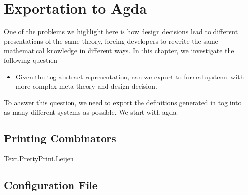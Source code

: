 \chapter{Exportation to Agda}
\label{ch:export}


One of the problems we highlight here is how design decisions lead to different presentations of the same theory, forcing developers to rewrite the same mathematical knowledge in different ways. In this chapter, we investigate the following question
\begin{itemize}
    \item Given the tog abstract representation, can we export to formal systems with more complex meta theory and design decision. 
\end{itemize}

To answer this question, we need to export the definitions generated in tog into as many different systems as possible. We start with agda. 

\section{Printing Combinators}
Text.PrettyPrint.Leijen

\section{Configuration File}


